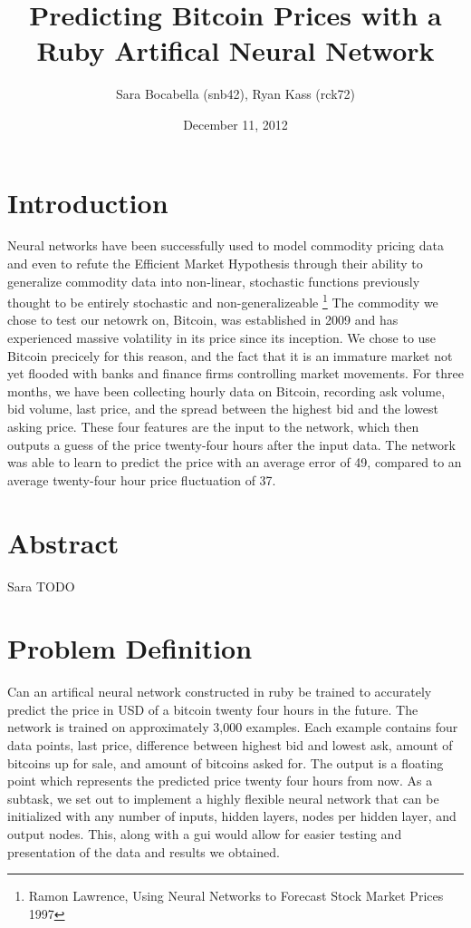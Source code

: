 \documentclass[a4paper,11pt]{article}
\title{Predicting Bitcoin Prices with a Ruby Artifical Neural Network}
\author{Sara Bocabella (snb42), Ryan Kass (rck72)}
\date{December 11, 2012}
\begin{document}
\maketitle
\section{Introduction}
Neural networks have been successfully used to
model commodity pricing data and even to refute the Efficient Market Hypothesis
through their ability to generalize commodity data into non-linear, 
stochastic functions previously thought to be entirely stochastic and non-generalizeable
\footnote{Ramon Lawrence, Using Neural Networks to Forecast Stock Market Prices 1997}
The commodity we chose to test our netowrk on, Bitcoin, was established in 2009 and has 
experienced massive volatility in its price since its inception.  We chose to use Bitcoin 
precicely for this reason, and the fact that it is an immature market not yet flooded with
banks and finance firms controlling market movements.
\newline \newline
For three months, we have been collecting hourly data on Bitcoin, recording
ask volume, bid volume, last price, and the spread between the highest bid and the lowest asking price.
These four features are the input to the network, which then outputs a guess of the price twenty-four
hours after the input data.  The network was able to learn to predict the price with an average error
of 49\cent, compared to an average twenty-four hour price fluctuation of 37\cent. 
\section{Abstract}

Sara TODO

\section{Problem Definition}
Can an artifical neural network constructed in ruby be trained to accurately predict the price in USD
of a bitcoin twenty four hours in the future.  The network is trained on approximately 3,000 examples.
Each example contains four data points, last price, difference between highest bid and lowest ask,
amount of bitcoins up for sale, and amount of bitcoins asked for.  The output is a floating point which
represents the predicted price twenty four hours from now.  As a subtask, we set out to implement a highly
flexible neural network that can be initialized with any number of inputs, hidden layers, nodes per hidden
layer, and output nodes.  This, along with a gui would allow for easier testing and presentation of the 
data and results we obtained.
\end{document}
